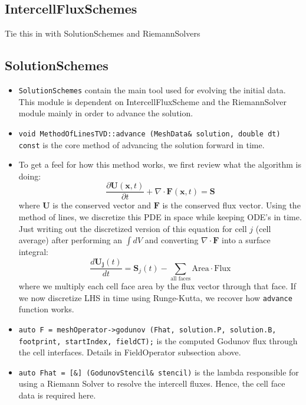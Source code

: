 \documentclass{article}
\begin{document}
\subsection{IntercellFluxSchemes}
Tie this in with SolutionSchemes and RiemannSolvers

\subsection{SolutionSchemes}
\begin{itemize}
	\item \texttt{SolutionSchemes} contain the main tool used for evolving the initial data. This module is dependent on IntercellFluxScheme and the RiemannSolver module mainly in order to advance the solution. 
	
	\item \texttt{void MethodOfLinesTVD::advance (MeshData\& solution, double dt) const} is the core method of advancing the solution forward in time. 
	
	\item To get a feel for how this method works, we first review what the algorithm is doing: 
	$$\frac{\partial \mathbf{U}(\mathbf{x},t)}{\partial t} + \nabla \cdot  \mathbf{F}(\mathbf{x},t) = \mathbf{S}$$ where $\mathbf{U}$ is the conserved vector and $\mathbf{F}$ is the conserved flux vector. Using the method of lines, we discretize this PDE in space while keeping ODE's in time. Just writing out the discretized version of this equation for cell $j$ (cell average) after performing an $\int dV$ and converting $\nabla \cdot \mathbf{F}$ into a surface integral:
	\begin{equation}
	\frac{d \mathbf{U_j}(t)}{dt} = \mathbf{S}_{j}(t)- \sum_{\text{all faces}} \text{Area} \cdot \text{Flux}
	\end{equation}
where we multiply each cell face area by the flux vector through that face. If we now discretize LHS in time using Runge-Kutta, we recover how \texttt{advance} function works.

	\item \texttt{auto F = meshOperator->godunov (Fhat, solution.P, solution.B, footprint, startIndex, fieldCT);} is the computed Godunov flux through the cell interfaces. Details in FieldOperator subsection above.
	
	\item \texttt{auto Fhat = [\&] (GodunovStencil\& stencil)} is the lambda responsible for using a Riemann Solver to resolve the intercell fluxes. Hence, the cell face data is required here.
	

\end{itemize}
\end{document}
